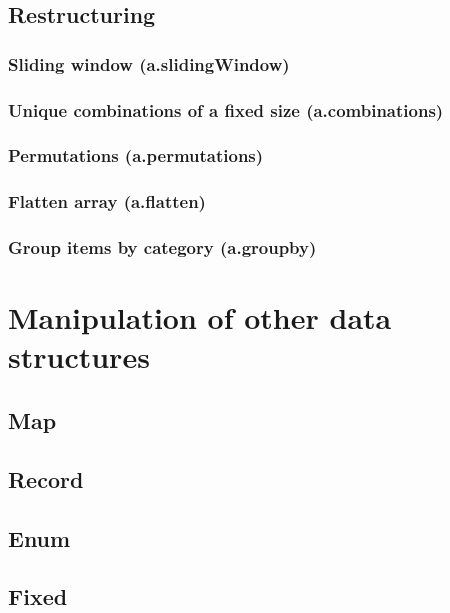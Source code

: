 \documentclass{article}
\theoremstyle{definition}
\begin{document}
\subsection{Restructuring}

\subsubsection{Sliding window (a.slidingWindow)}

\subsubsection{Unique combinations of a fixed size (a.combinations)}

\subsubsection{Permutations (a.permutations)}

\subsubsection{Flatten array (a.flatten)}

\subsubsection{Group items by category (a.groupby)}

\pagebreak

\section{Manipulation of other data structures}

\subsection{Map}

\subsection{Record}

\subsection{Enum}

\subsection{Fixed}
\end{document}
